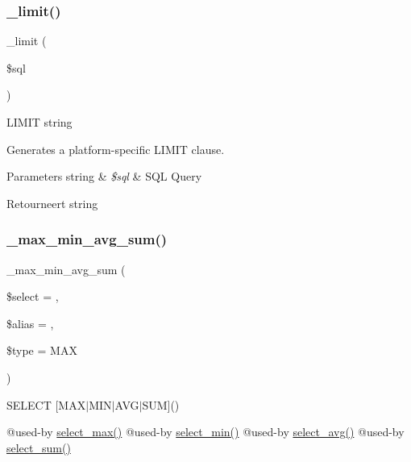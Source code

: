\subsubsection{\texorpdfstring{\_limit()}{\_limit()}}
{\footnotesize\ttfamily \+\_\+limit (\begin{DoxyParamCaption}\item[{}]{\$sql }\end{DoxyParamCaption})\hspace{0.3cm}{\ttfamily [protected]}}

L\+I\+M\+IT string

Generates a platform-\/specific L\+I\+M\+IT clause.


\begin{DoxyParams}[1]{Parameters}
string & {\em \$sql} & S\+QL Query \\
\hline
\end{DoxyParams}
\begin{DoxyReturn}{Retourneert}
string 
\end{DoxyReturn}
\mbox{\label{class_c_i___d_b__query__builder_aea731223718d87a26bb6dc676ee4ee8c}} 
\subsubsection{\texorpdfstring{\_max\_min\_avg\_sum()}{\_max\_min\_avg\_sum()}}
{\footnotesize\ttfamily \+\_\+max\+\_\+min\+\_\+avg\+\_\+sum (\begin{DoxyParamCaption}\item[{}]{\$select = {\ttfamily \textquotesingle{}\textquotesingle{}},  }\item[{}]{\$alias = {\ttfamily \textquotesingle{}\textquotesingle{}},  }\item[{}]{\$type = {\ttfamily \textquotesingle{}MAX\textquotesingle{}} }\end{DoxyParamCaption})\hspace{0.3cm}{\ttfamily [protected]}}

S\+E\+L\+E\+CT \mbox{[}M\+A\+X$\vert$\+M\+I\+N$\vert$\+A\+V\+G$\vert$\+S\+UM\mbox{]}()

@used-\/by \mbox{\hyperlink{class_c_i___d_b__query__builder_a4eac30ba8703ba8f62664e3b4ea1a177}{select\+\_\+max()}} @used-\/by \mbox{\hyperlink{class_c_i___d_b__query__builder_ab8cf650dd779435da91d6f50bf082528}{select\+\_\+min()}} @used-\/by \mbox{\hyperlink{class_c_i___d_b__query__builder_a0377f6833e394c977823e21413772761}{select\+\_\+avg()}} @used-\/by \mbox{\hyperlink{class_c_i___d_b__query__builder_a42348c349cf2fa7ca0210087efcf98d3}{select\+\_\+sum()}}


